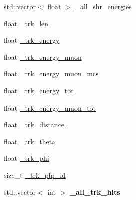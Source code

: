 \begin{DoxyCompactItemize}
\item 
std\+::vector$<$ float $>$ \hyperlink{classselection_1_1CC0piNpSelection_a0397406f8ed009ad17e2759168c21163}{\+\_\+all\+\_\+shr\+\_\+energies}
\item 
float \hyperlink{classselection_1_1CC0piNpSelection_aab7945993678b44d7100abac6cc71655}{\+\_\+trk\+\_\+len}
\item 
float \hyperlink{classselection_1_1CC0piNpSelection_a98e03f33f34b5df397a1d1144b1de4a1}{\+\_\+trk\+\_\+energy}
\item 
float \hyperlink{classselection_1_1CC0piNpSelection_aabcb2e3b6df63f077fc37d881c1794a3}{\+\_\+trk\+\_\+energy\+\_\+muon}
\item 
float \hyperlink{classselection_1_1CC0piNpSelection_a4ae8946bcc37ce152c81ba3c28d60fbb}{\+\_\+trk\+\_\+energy\+\_\+muon\+\_\+mcs}
\item 
float \hyperlink{classselection_1_1CC0piNpSelection_a8a0da0081e2f182880249debba6551e3}{\+\_\+trk\+\_\+energy\+\_\+tot}
\item 
float \hyperlink{classselection_1_1CC0piNpSelection_aebac9c09110d469f5d7ed3817c33e437}{\+\_\+trk\+\_\+energy\+\_\+muon\+\_\+tot}
\item 
float \hyperlink{classselection_1_1CC0piNpSelection_a0f16777192fbed04bcc67edfdfa67e6b}{\+\_\+trk\+\_\+distance}
\item 
float \hyperlink{classselection_1_1CC0piNpSelection_a08cd38de74e9611829a3580a310c19f2}{\+\_\+trk\+\_\+theta}
\item 
float \hyperlink{classselection_1_1CC0piNpSelection_a85a6029e249e3ff20ea6d8eaabf22142}{\+\_\+trk\+\_\+phi}
\item 
size\+\_\+t \hyperlink{classselection_1_1CC0piNpSelection_a641e7e656a28a5b31a5c8ab21dad9d3b}{\+\_\+trk\+\_\+pfp\+\_\+id}
\item 
std\+::vector$<$ int $>$ {\bfseries \+\_\+all\+\_\+trk\+\_\+hits}\hypertarget{classselection_1_1CC0piNpSelection_a99975441ca38a84087f460b48648c784}{}\label{classselection_1_1CC0piNpSelection_a99975441ca38a84087f460b48648c784}


\end{DoxyCompactItemize}
